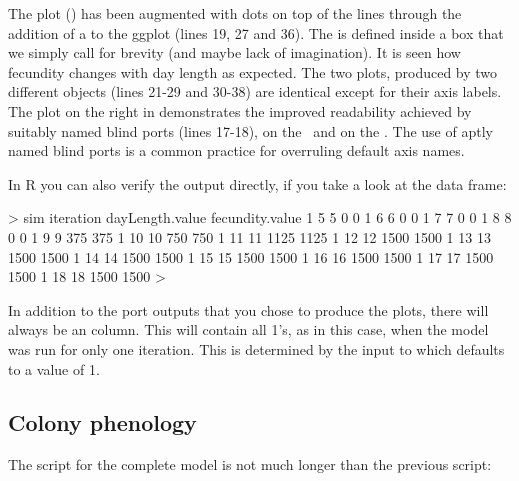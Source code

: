 The plot () has been augmented with dots on top of the lines through the addition of a  to the ggplot (lines 19, 27 and 36). The  is defined inside a box that we simply call  for brevity (and maybe lack of imagination). It is seen how fecundity changes with day length as expected. The two plots, produced by two different  objects (lines 21-29 and 30-38) are identical except for their axis labels. The plot on the right in  demonstrates the improved readability achieved by suitably named blind ports (lines 17-18),  on the \xaxis\ and  on the \yaxis. The use of aptly named blind ports is a common practice for overruling default axis names.

In R you can also verify the output directly, if you take a look at the  data frame:

\begin{rdialog}
> sim
iteration dayLength.value fecundity.value %
1     5         5      0          0
1     6         6      0          0
1     7         7      0          0
1     8         8      0          0
1     9         9    375        375
1    10        10    750        750
1    11        11   1125       1125
1    12        12   1500       1500
1    13        13   1500       1500
1    14        14   1500       1500
1    15        15   1500       1500
1    16        16   1500       1500
1    17        17   1500       1500
1    18        18   1500       1500
> 
\end{rdialog}

In addition to the port outputs that you chose to produce the plots, there will always be an  column. This will contain all 1's, as in this case, when the model was run for only one iteration. This is determined by the  input to  which defaults to a value of 1.

\subsection{Colony phenology}

The script for the complete model is not much longer than the previous script:

